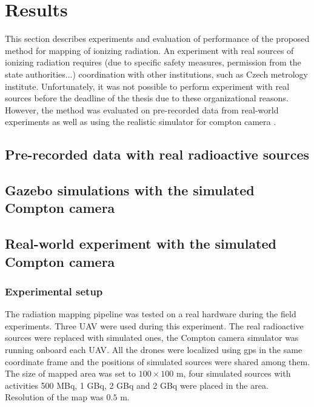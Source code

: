
\chapter{Results\label{chap:results}}

This section describes experiments and evaluation of performance of the proposed method for mapping of ionizing radiation.
An experiment with real sources of ionizing radiation requires (due to specific safety measures, permission from the state authorities...) coordination with other institutions, such as Czech metrology institute.
Unfortunately, it was not possible to perform experiment with real sources before the deadline of the thesis due to these organizational reasons.
However, the method was evaluated on pre-recorded data from real-world experiments as well as using the realistic simulator for compton camera \cite{TODO}.

\section{Pre-recorded data with real radioactive sources}


\section{Gazebo simulations with the simulated Compton camera}

\section{Real-world experiment with the simulated Compton camera}
\subsection{Experimental setup}
The radiation mapping pipeline was tested on a real hardware during the field experiments.
Three \ac{UAV} were used during this experiment.
The real radioactive sources were replaced with simulated ones, the Compton camera simulator \cite{TODO} was running onboard each \ac{UAV}.
All the drones were localized using \ac{gps} in the same coordinate frame and the positions of simulated sources were shared among them.
The size of mapped area was set to $100 \times 100$ m, four simulated sources with activities 500 MBq, 1 GBq, 2 GBq and 2 GBq were placed in the area.
Resolution of the map was $0.5$ m.

